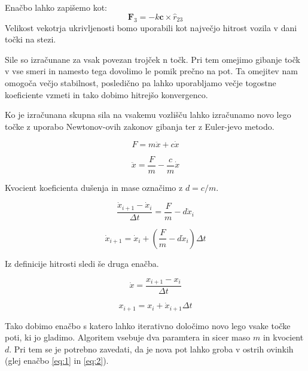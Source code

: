 \documentclass[10pt,a4paper]{article}
\begin{document}
Enačbo lahko zapišemo kot:
\begin{equation}
\mathbf{F}_3 = -k \mathbf{c} \times \hat{r}_{23}
\end{equation}
Velikost vekotrja ukrivljenosti bomo uporabili kot največjo hitrost vozila v dani točki na stezi.

Sile so izračunane za vsak povezan trojček n točk. Pri tem omejimo gibanje točk v vse smeri in namesto tega dovolimo le pomik prečno na pot. Ta omejitev nam omogoča večjo stabilnost, posledično pa lahko uporabljamo večje togostne koeficiente vzmeti in tako dobimo hitrejšo konvergenco.

Ko je izračunana skupna sila na vsakemu vozlišču lahko izračunamo novo lego točke z uporabo Newtonov-ovih zakonov gibanja ter z Euler-jevo metodo.

\begin{equation}
F = m \ddot{x} + c \dot{x}
\end{equation}

\begin{equation}
\ddot{x} = \frac{F}{m} - \frac{c}{m} \dot{x}
\end{equation}

Kvocient koeficienta dušenja in mase označimo z $d = c / m$.

\begin{equation}
\frac{\dot{x}_{i+1} - \dot{x}_i}{\Delta t} = \frac{F}{m} - d \dot{x}_i
\end{equation}

\begin{equation}
\dot{x}_{i+1} = \dot{x}_i + (\frac{F}{m} - d \dot{x}_i)\Delta t
\end{equation}

Iz definicije hitrosti sledi še druga enačba.

\begin{equation}
\dot{x} = \frac{x_{i+1} - x_i}{\Delta t}
\end{equation}

\begin{equation}
x_{i + 1} = x_{i} + \dot{x}_{i + 1} \Delta t 
\end{equation}

Tako dobimo enačbo s katero lahko iterativno določimo novo lego vsake točke poti, ki jo gladimo. Algoritem vsebuje dva paramtera in sicer maso $m$ in kvocient $d$. Pri tem se je potrebno zavedati, da je nova pot lahko groba v ostrih ovinkih (glej enačbo \ref{eq:1} in \ref{eq:2}).
\end{document}

